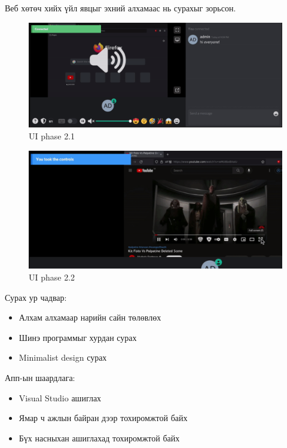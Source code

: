 Веб хөтөч хийх үйл явцыг эхний алхамаас нь сурахыг зорьсон. 
\begin{figure}
	\centering
	\includegraphics[width=15cm]{images/ui21.png}
	\caption{UI phase 2.1}
	\label{fig:form}
\end{figure}
\begin{figure}
	\centering
	\includegraphics[width=15cm]{images/ui22.png}
	\caption{UI phase 2.2}
	\label{fig:form}
\end{figure}
Сурах ур чадвар: 
\begin{itemize}
    \item Алхам алхамаар нарийн сайн төлөвлөх
    \item Шинэ программыг хурдан сурах
    \item Minimalist design сурах
\end{itemize}

Апп-ын шаардлага: 
\begin{itemize}
    \item Visual Studio ашиглах
    \item Ямар ч ажлын байран дээр тохиромжтой байх
    \item Бүх насныхан ашиглахад тохиромжтой байх
\end{itemize}
\pagebreak
